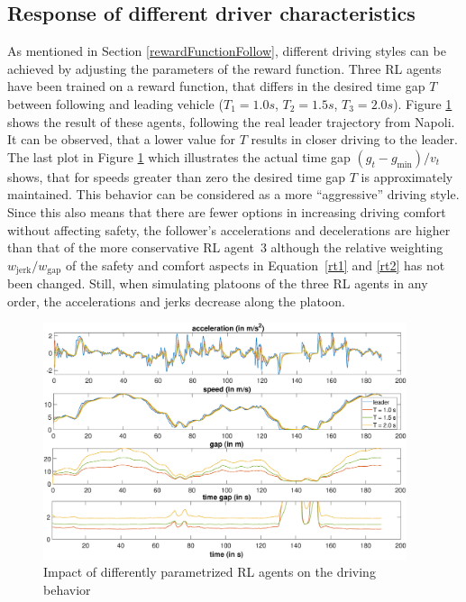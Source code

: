 \documentclass[review]{elsarticle}
\providecommand{\sub}[1]{_{\mathrm{#1}}}  %
\providecommand{\3}{{\ss}}
\begin{document}
	
	\subsection{Response of different driver characteristics}
	\label{sec:differentT}
	
	As mentioned in Section \ref{rewardFunctionFollow}, different driving styles
	can be achieved by adjusting the parameters of the reward
	function. Three RL agents have been trained on a reward function, that
	differs in the desired time gap $T$ between following and
	leading vehicle ($T_{1} = 1.0s$, $T_{2} = 1.5s$, 
	$T_{3} =2.0s$). Figure \ref{fig:differentT} shows the result of these agents,
	following the real leader trajectory from Napoli. It can be observed,
	that a lower value for $T$ results in closer driving to the
	leader. The last plot in Figure \ref{fig:differentT} which illustrates the actual time gap $ (g_t-g\sub{min})/v_t$ shows, that for speeds greater than zero the desired time gap $T$ is approximately maintained.
	This behavior can be considered as a more ``aggressive''
	driving style. Since this also means that there are fewer options in
	increasing driving comfort without affecting safety, the follower's
	accelerations and decelerations are higher than that of the more
	conservative RL agent~3 although the relative
	weighting $w\sub{jerk}/w\sub{gap}$ of the safety and comfort aspects in Equation~\eqref{rt1} and \eqref{rt2} has not been
	changed. Still, when simulating platoons of the three RL
	agents in any order, the accelerations and jerks decrease along the
	platoon.
	
	\begin{figure}
		\centering
		\includegraphics[width=0.95\textwidth]{images/differentT}
		\caption{Impact of differently parametrized RL agents
			on the driving behavior }
		\label{fig:differentT}
	\end{figure}
	
\end{document}
